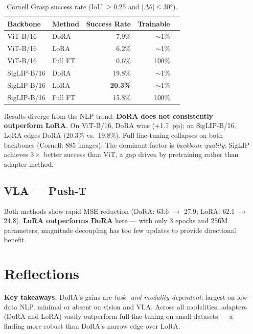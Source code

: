 \documentclass[11pt]{article}
\begin{document}
\begin{table}[h!]
	\centering\small
	\begin{tabular}{@{}llrrr@{}}
		\toprule
		Backbone    & Method  & Success Rate    & Trainable \\
		\midrule
		ViT-B/16    & DoRA    & 7.9\%           & $\sim$1\% \\
		ViT-B/16    & LoRA    & 6.2\%           & $\sim$1\% \\
		ViT-B/16    & Full FT & 0.6\%           & 100\%     \\
		SigLIP-B/16 & DoRA    & 19.8\%          & $\sim$1\% \\
		SigLIP-B/16 & LoRA    & \textbf{20.3\%} & $\sim$1\% \\
		SigLIP-B/16 & Full FT & 15.8\%          & 100\%     \\
		\bottomrule
	\end{tabular}
	\caption{Cornell Grasp success rate (IoU $\geq$0.25 and $|\Delta\theta|\leq30°$).}
\end{table}

Results diverge from the NLP trend: \textbf{DoRA does not consistently outperform LoRA}.
On ViT-B/16, DoRA wins (+1.7~pp); on SigLIP-B/16, LoRA edges DoRA (20.3\% vs.\ 19.8\%).
Full fine-tuning collapses on both backbones (Cornell: 885 images). The dominant factor is \emph{backbone quality}: SigLIP achieves $3\times$ better success than ViT, a gap driven by pretraining rather than adapter method.

\subsection{VLA — Push-T}

Both methods show rapid MSE reduction (DoRA: 63.6 $\to$ 27.9; LoRA: 62.1 $\to$ 24.8).
\textbf{LoRA outperforms DoRA} here — with only 3 epochs and 256M parameters, magnitude decoupling has too few updates to provide directional benefit.

\section{Reflections}

\textbf{Key takeaways.} DoRA's gains are \emph{task- and modality-dependent}: largest on low-data NLP, minimal or absent on vision and VLA. Across all modalities, adapters (DoRA and LoRA) vastly outperform full fine-tuning on small datasets — a finding more robust than DoRA's narrow edge over LoRA.
\end{document}
